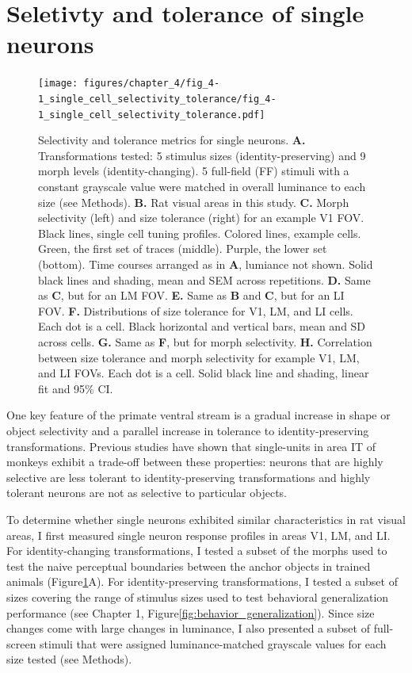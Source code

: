\section{Seletivty and tolerance of single neurons}
\begin{figure}[t!]
    \texttt{[image: figures/chapter\_4/fig\_4-1\_single\_cell\_selectivity\_tolerance/fig\_4-1\_single\_cell\_selectivity\_tolerance.pdf]}
    \caption[Single neuron selectivity and tolerance]{Selectivity and tolerance metrics for single neurons. 
    \textbf{A.} Transformations tested: 5 stimulus sizes (identity-preserving) and 9 morph levels (identity-changing). 5 full-field (FF) stimuli with a constant grayscale value were matched in overall luminance to each size (see Methods).
    \textbf{B.} Rat visual areas in this study. 
    \textbf{C.} Morph selectivity (left) and size tolerance (right) for an example V1 FOV. Black lines, single cell tuning profiles. Colored lines, example cells. Green, the first set of traces (middle). Purple, the lower set (bottom). Time courses arranged as in \textbf{A}, lumiance not shown. Solid black lines and shading, mean and SEM across repetitions.
    \textbf{D.} Same as \textbf{C}, but for an LM FOV.
    \textbf{E.} Same as \textbf{B} and \textbf{C}, but for an LI FOV.
    \textbf{F.} Distributions of size tolerance for V1, LM, and LI cells. Each dot is a cell. Black horizontal and vertical bars, mean and SD across cells.
    \textbf{G.} Same as \textbf{F}, but for morph selectivity. 
    \textbf{H.} Correlation between size tolerance and morph selectivity for example V1, LM, and LI FOVs. Each dot is a cell. Solid black line and shading, linear fit and 95\% CI.
    \label{fig:selectivity_tolerance}}
\end{figure}

One key feature of the primate ventral stream is a gradual increase in shape or object selectivity and a parallel increase in tolerance to identity-preserving transformations. Previous studies have shown that single-units in area IT of monkeys exhibit a trade-off between these properties: neurons that are highly selective are less tolerant to identity-preserving transformations and highly tolerant neurons are not as selective to particular objects\cite{Zoccolan2007}.

To determine whether single neurons exhibited similar characteristics in rat visual areas, I first measured single neuron response profiles in areas V1, LM, and LI. For identity-changing transformations, I tested a subset of the morphs used to test the naive perceptual boundaries between the anchor objects in trained animals (Figure\ref{fig:selectivity_tolerance}A). For identity-preserving transformations, I tested a subset of sizes covering the range of stimulus sizes used to test behavioral generalization performance (see Chapter 1, Figure\ref{fig:behavior_generalization}). Since size changes come with large changes in luminance, I also presented a subset of full-screen stimuli that were assigned luminance-matched grayscale values for each size tested (see Methods).

